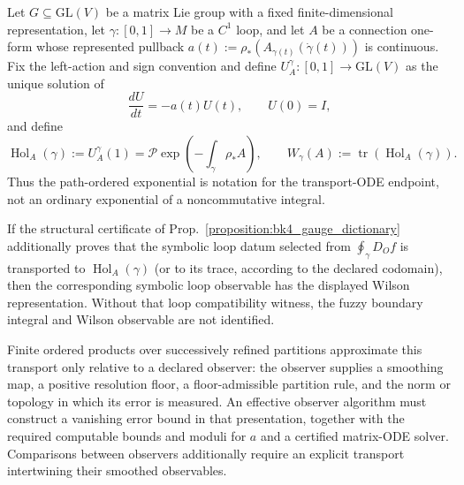 \begin{corollary}
\label{corollary:bk4_wilson_loop}
Let $G\subseteq\mathrm{GL}(V)$ be a matrix Lie group with a fixed
finite-dimensional representation, let $\gamma:[0,1]\to M$ be a $C^1$ loop,
and let $A$ be a connection one-form whose represented pullback
$a(t):=\rho_*(A_{\gamma(t)}(\dot\gamma(t)))$ is continuous.  Fix the left-action and sign convention and define
$U_A^\gamma:[0,1]\to\mathrm{GL}(V)$ as the unique solution of
\[
 \frac{dU}{dt}=-a(t)U(t),\qquad U(0)=I,
\]
and define
\[
 \operatorname{Hol}_A(\gamma):=U_A^\gamma(1)
 =\mathcal P\exp\!\left(-\int_\gamma \rho_*A\right),
 \qquad
 W_\gamma(A):=\operatorname{tr}(\operatorname{Hol}_A(\gamma)).
\]
Thus the path-ordered exponential is notation for the transport-ODE endpoint,
not an ordinary exponential of a noncommutative integral.

If the structural certificate of
Prop.~\ref{proposition:bk4_gauge_dictionary} additionally proves that the
symbolic loop datum selected from
$\oint_\gamma D_Of$ is transported to $\operatorname{Hol}_A(\gamma)$ (or to
its trace, according to the declared codomain), then the corresponding symbolic
loop observable has the displayed Wilson representation.  Without that loop
compatibility witness, the fuzzy boundary integral and Wilson observable are
not identified.

Finite ordered products over successively refined partitions approximate this
transport only relative to a declared observer: the observer supplies a
smoothing map, a positive resolution floor, a floor-admissible partition rule,
and the norm or topology in which its error is measured.  An effective
observer algorithm must construct a vanishing error bound in that presentation,
together with the required computable bounds and moduli for $a$ and a certified
matrix-ODE solver.  Comparisons between observers additionally require an
explicit transport intertwining their smoothed observables.
\end{corollary}

